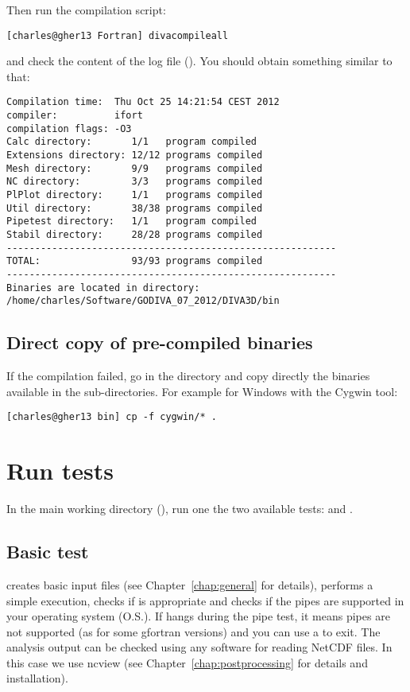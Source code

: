 Then run the compilation script: 
\begin{lstlisting}[style=Bash]
[charles@gher13 Fortran] divacompileall
\end{lstlisting}
and check the content of the log file (). You should obtain something similar to that:
\begin{verbatim}
Compilation time:  Thu Oct 25 14:21:54 CEST 2012
compiler:          ifort
compilation flags: -O3
Calc directory:       1/1   program compiled
Extensions directory: 12/12 programs compiled
Mesh directory:       9/9   programs compiled
NC directory:         3/3   programs compiled
PlPlot directory:     1/1   programs compiled
Util directory:       38/38 programs compiled
Pipetest directory:   1/1   program compiled
Stabil directory:     28/28 programs compiled
----------------------------------------------------------
TOTAL:                93/93 programs compiled
----------------------------------------------------------
Binaries are located in directory:
/home/charles/Software/GODIVA_07_2012/DIVA3D/bin
\end{verbatim}

\subsection{Direct copy of pre-compiled binaries}

If the compilation failed, go in the  directory and copy directly the binaries available in the sub-directories. For example for Windows with the Cygwin tool:
\begin{lstlisting}[style=Bash]
[charles@gher13 bin] cp -f cygwin/* .
\end{lstlisting}

\section{Run tests\label{sec:divatest}}

In the main working directory (), run one the two available tests:  and . 


\subsection{Basic test}


 creates basic input files (see Chapter~\ref{chap:general} for details), performs a simple \diva execution, checks if  is appropriate and checks if the pipes are supported in your operating system (O.S.). If  hangs during the pipe test, it means pipes are not supported (as for some gfortran versions) and you can use a  to exit. The analysis output can be checked using any software for reading NetCDF files. In this case we use ncview (see Chapter~\ref{chap:postprocessing} for details and installation). 

